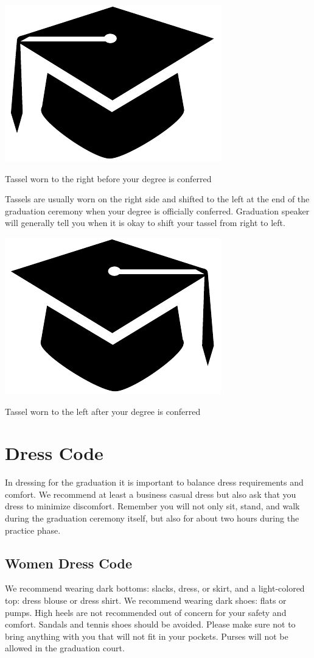 \documentclass{tufte-handout}
\begin{document}
\begin{marginfigure}[\baselineskip]%
\hspace*{0.02in}
  \includegraphics[width=.45\linewidth]{capbwR}
  \caption{\linespread{1.3}\selectfont{}Tassel worn to the right before your degree is conferred}
  \label{fig:cap-right}
\end{marginfigure}

Tassels are usually worn on the right side and shifted to the left at the end of the graduation ceremony when your degree is officially conferred. Graduation speaker will generally tell you when it is okay to shift your tassel from right to left.

\begin{marginfigure}[\baselineskip]%
\hspace*{0.02in}
  \includegraphics[width=.45\linewidth]{capbwL}
  \caption{\linespread{1.3}\selectfont{}Tassel worn to the left after your degree is conferred}
  \label{fig:cap-left}
\end{marginfigure}

\section{Dress Code}
In dressing for the graduation it is important to balance dress requirements and comfort. We recommend at least a business casual dress but also ask that you dress to minimize discomfort. Remember you will not only sit, stand, and walk during the graduation ceremony itself, but also for about two hours during the practice phase. 

\subsection{Women Dress Code}
We recommend wearing dark bottoms: slacks, dress, or skirt, and a light-colored top: dress blouse or dress shirt. We recommend wearing dark shoes: flats or pumps. High heels are not recommended out of concern for your safety and comfort. Sandals and tennis shoes should be avoided. Please make sure not to bring anything with you that will not fit in your pockets. Purses will not be allowed in the graduation court.
\end{document}
